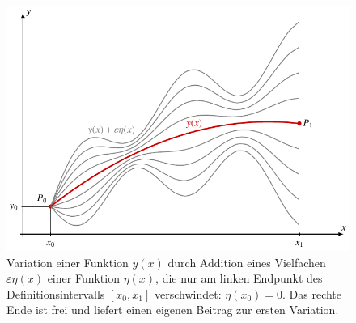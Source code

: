 %
%
%
\begin{figure}
\centering
\includegraphics{chapters/020-variation/images/variation1.pdf}
\caption{Variation einer Funktion $y(x)$ durch Addition eines Vielfachen
$\varepsilon\eta(x)$ einer Funktion $\eta(x)$, die nur am linken Endpunkt
des Definitionsintervalls $[x_0,x_1]$ verschwindet: $\eta(x_0)=0$.
Das rechte Ende ist frei und liefert einen eigenen Beitrag zur ersten
Variation.
\label{buch:variation:fig:variation0}}
\end{figure}
